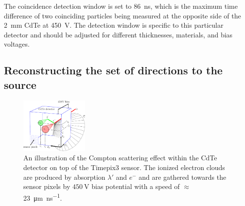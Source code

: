 \documentclass[a4paper,11pt,titlepage,twoside]{book}
\begin{document}
The coincidence detection window is set to \SI{86}{\nano\second}, which is the maximum time difference of two coinciding particles being measured at the opposite side of the \SI{2}{\milli\meter} \ac{CdTe} at \SI{450}{\volt}.
The detection window is specific to this particular detector and should be adjusted for different thicknesses, materials, and bias voltages.

\subsection{Reconstructing the set of directions to the source}


\begin{figure}
  \centering
  \includegraphics[width=0.30\textwidth]{./fig/sketch/compton_3d.pdf}
  \caption{
    An illustration of the Compton scattering effect within the \ac{CdTe} detector on top of the Timepix3 sensor.
    The ionized electron clouds are produced by absorption $\lambda'$ and $e^-$ and are gathered towards the sensor pixels by $\SI{450}{\volt}$ bias potential with a speed of $\approx$\,\SI{23}{\micro\meter\per\nano\second}.
  }
  \label{fig:3d_cone_reconstruction}
\end{figure}

\end{document}
